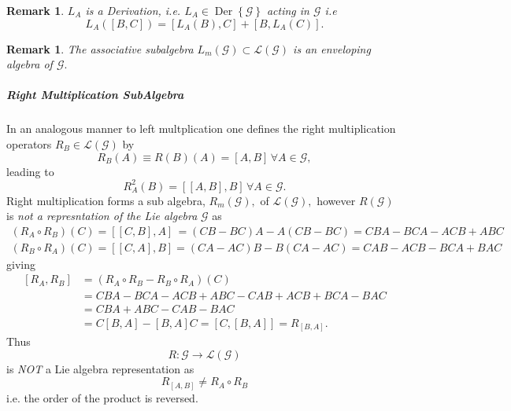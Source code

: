 \documentclass[aps,preprint]{revtex4}%
\newtheorem{remark}[theorem]{Remark}
\begin{document}
\begin{remark}
$L_{A}$ is a \emph{Derivation}, i.e. $L_{A}\in\operatorname{Der}\left\{
\mathcal{G}\right\}  $ acting in $\mathcal{G}$ i.e
\begin{equation}
L_{A}\left(  \left[  B,C\right]  \right)  =\left[  L_{A}\left(  B\right)
,C\right]  +\left[  B,L_{A}\left(  C\right)  \right]  .
\end{equation}

\end{remark}

\begin{remark}
The associative subalgebra $L_{m}\left(  \mathcal{G}\right)  \subset
\mathcal{L}\left(  \mathcal{G}\right)  $ is an \emph{enveloping algebra }of
$\mathcal{G}.$
\end{remark}

\subparagraph{Right Multiplication SubAlgebra}

In an analogous manner to left multplication one defines the right
multiplication operators $R_{B}\in\mathcal{L}\left(  \mathcal{G}\right)  $ by
\begin{equation}
R_{B}\left(  A\right)  \equiv R\left(  B\right)  \left(  A\right)  =\left[
A,B\right]  \,\forall A\in\mathcal{G},
\end{equation}
leading to
\begin{equation}
R_{A}^{2}\left(  B\right)  =\left[  \left[  A,B\right]  ,B\right]  \,\forall
A\in\mathcal{G}.
\end{equation}
Right multiplication forms a sub algebra, $R_{m}\left(  \mathcal{G}\right)  ,$
of $\mathcal{L}\left(  \mathcal{G}\right)  ,$ however $R\left(  \mathcal{G}%
\right)  $ is \emph{not a represntation of the Lie algebra }$\mathcal{G}$ as
\begin{gather}
\left(  R_{A}\circ R_{B}\right)  \left(  C\right)  =\left[  \left[
C,B\right]  ,A\right]  \,=\left(  CB-BC\right)  A-A\left(  CB-BC\right)
=CBA-BCA-ACB+ABC\\
\left(  R_{B}\circ R_{A}\right)  \left(  C\right)  =\left[  \left[
C,A\right]  ,B\right]  =\left(  CA-AC\right)  B-B\left(  CA-AC\right)
=CAB-ACB-BCA+BAC
\end{gather}
giving
\begin{align}
\left[  R_{A},R_{B}\right]   &  =\left(  R_{A}\circ R_{B}-R_{B}\circ
R_{A}\right)  \left(  C\right)  \\
&  =CBA-BCA-ACB+ABC-CAB+ACB+BCA-BAC\\
&  =CBA+ABC-CAB-BAC\\
&  =C\left[  B,A\right]  -\left[  B,A\right]  C=\left[  C,\left[  B,A\right]
\right]  =R_{\left[  B,A\right]  }.
\end{align}
Thus
\begin{equation}
R:\mathcal{G}\rightarrow\mathcal{L}\left(  \mathcal{G}\right)
\end{equation}
is \emph{NOT} a Lie algebra representation as
\begin{equation}
R_{\left[  A,B\right]  }\neq R_{A}\circ R_{B}%
\end{equation}
i.e. the order of the product is reversed.
\end{document}
